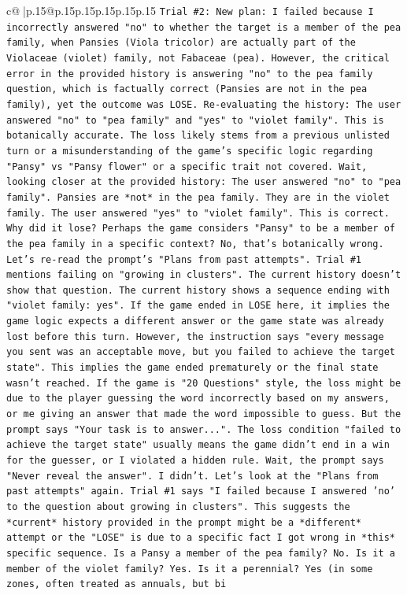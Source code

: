 \documentclass{article}
\begin{document}
{\begin{supertabular}{c@{$\;$}|p{.15\linewidth}@{}p{.15\linewidth}p{.15\linewidth}p{.15\linewidth}p{.15\linewidth}p{.15\linewidth}}
{{{\texttt{Trial \#2: New plan: I failed because I incorrectly answered "no" to whether the target is a member of the pea family, when Pansies (Viola tricolor) are actually part of the Violaceae (violet) family, not Fabaceae (pea). However, the critical error in the provided history is answering "no" to the pea family question, which is factually correct (Pansies are not in the pea family), yet the outcome was LOSE. Re{-}evaluating the history: The user answered "no" to "pea family" and "yes" to "violet family". This is botanically accurate. The loss likely stems from a previous unlisted turn or a misunderstanding of the game's specific logic regarding "Pansy" vs "Pansy flower" or a specific trait not covered. Wait, looking closer at the provided history: The user answered "no" to "pea family". Pansies are *not* in the pea family. They are in the violet family. The user answered "yes" to "violet family". This is correct. Why did it lose? Perhaps the game considers "Pansy" to be a member of the pea family in a specific context? No, that's botanically wrong. Let's re{-}read the prompt's "Plans from past attempts". Trial \#1 mentions failing on "growing in clusters". The current history doesn't show that question. The current history shows a sequence ending with "violet family: yes". If the game ended in LOSE here, it implies the game logic expects a different answer or the game state was already lost before this turn. However, the instruction says "every message you sent was an acceptable move, but you failed to achieve the target state". This implies the game ended prematurely or the final state wasn't reached. If the game is "20 Questions" style, the loss might be due to the player guessing the word incorrectly based on my answers, or me giving an answer that made the word impossible to guess. But the prompt says "Your task is to answer...". The loss condition "failed to achieve the target state" usually means the game didn't end in a win for the guesser, or I violated a hidden rule. Wait, the prompt says "Never reveal the answer". I didn't. Let's look at the "Plans from past attempts" again. Trial \#1 says "I failed because I answered 'no' to the question about growing in clusters". This suggests the *current* history provided in the prompt might be a *different* attempt or the "LOSE" is due to a specific fact I got wrong in *this* specific sequence. Is a Pansy a member of the pea family? No. Is it a member of the violet family? Yes. Is it a perennial? Yes (in some zones, often treated as annuals, but bi} \\
\\ 
}}}
\end{supertabular}}
\end{document}
